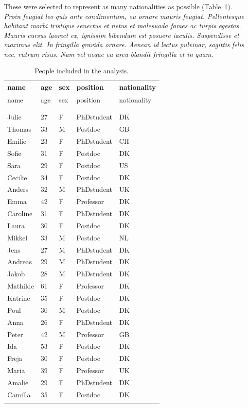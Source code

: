 \documentclass[
  a4paper,
]{scrbook}
\begin{document}
These were selected to represent as many nationalities as possible
(Table~\ref{tbl-subjects}). \emph{Proin feugiat leo quis ante
condimentum, eu ornare mauris feugiat. Pellentesque habitant morbi
tristique senectus et netus et malesuada fames ac turpis egestas. Mauris
cursus laoreet ex, ignissim bibendum est posuere iaculis. Suspendisse et
maximus elit. In fringilla gravida ornare. Aenean id lectus pulvinar,
sagittis felis nec, rutrum risus. Nam vel neque eu arcu blandit
fringilla et in quam.}

\begin{longtable}[]{@{}lllll@{}}

\toprule\noalign{}
name & age & sex & position & nationality \\
\midrule\noalign{}
\endfirsthead
\toprule\noalign{}
name & age & sex & position & nationality \\
\midrule\noalign{}
\endhead
\bottomrule\noalign{}
\tabularnewline
\caption{}\label{T_0b8ad}\tabularnewline
\endlastfoot
Julie & 27 & F & PhDstudent & DK \\
Thomas & 33 & M & Postdoc & GB \\
Emilie & 23 & F & PhDstudent & CH \\
Sofie & 31 & F & Postdoc & DK \\
Sara & 29 & F & Postdoc & US \\
Cecilie & 34 & F & Postdoc & DK \\
Anders & 32 & M & PhDstudent & UK \\
Emma & 42 & F & Professor & DK \\
Caroline & 31 & F & PhDstudent & DK \\
Laura & 30 & F & Postdoc & DK \\
Mikkel & 33 & M & Postdoc & NL \\
Jens & 27 & M & PhDstudent & DK \\
Andreas & 29 & M & PhDstudent & DK \\
Jakob & 28 & M & PhDstudent & DK \\
Mathilde & 61 & F & Professor & DK \\
Katrine & 35 & F & Postdoc & DK \\
Poul & 30 & M & Postdoc & DK \\
Anna & 26 & F & PhDstudent & DK \\
Peter & 42 & M & Professor & GB \\
Ida & 53 & F & Postdoc & DK \\
Freja & 30 & F & Postdoc & DK \\
Maria & 39 & F & Professor & UK \\
Amalie & 29 & F & PhDstudent & DK \\
Camilla & 35 & F & Postdoc & DK \\


\caption{\label{tbl-subjects}People included in the analysis.}

\tabularnewline
\end{longtable}
\end{document}
